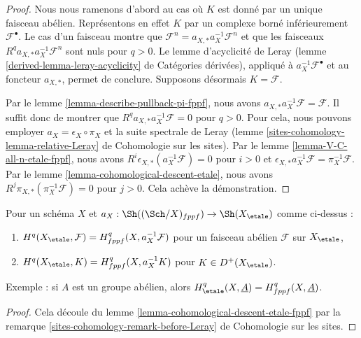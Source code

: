 \begin{proof}
Nous nous ramenons d'abord au cas où
$K$ est donné par un unique faisceau abélien. Représentons en effet $K$
par un complexe borné inférieurement $\mathcal{F}^\bullet$. Le cas d'un
faisceau montre que
$\mathcal{F}^n = a_{X, *} a_X^{-1} \mathcal{F}^n$
et que les faisceaux $R^qa_{X, *}a_X^{-1}\mathcal{F}^n$
sont nuls pour $q > 0$. Le lemme d'acyclicité de Leray
(lemme \ref{derived-lemma-leray-acyclicity} de Catégories dérivées),
appliqué à $a_X^{-1}\mathcal{F}^\bullet$
et au foncteur $a_{X, *}$, permet de conclure. Supposons désormais $K = \mathcal{F}$.

\medskip\noindent
Par le lemme \ref{lemma-describe-pullback-pi-fppf}, nous avons
$a_{X, *}a_X^{-1}\mathcal{F} = \mathcal{F}$. Il suffit donc de montrer que
$R^qa_{X, *}a_X^{-1}\mathcal{F} = 0$ pour $q > 0$.
Pour cela, nous pouvons employer $a_X = \epsilon_X \circ \pi_X$ et
la suite spectrale de Leray
(lemme \ref{sites-cohomology-lemma-relative-Leray} de Cohomologie sur les sites).
Par le lemme \ref{lemma-V-C-all-n-etale-fppf},
nous avons $R^i\epsilon_{X, *}(a_X^{-1}\mathcal{F}) = 0$ pour $i > 0$
et
$\epsilon_{X, *}a_X^{-1}\mathcal{F} = \pi_X^{-1}\mathcal{F}$.
Par le lemme \ref{lemma-cohomological-descent-etale}, nous avons
$R^j\pi_{X, *}(\pi_X^{-1}\mathcal{F}) = 0$ pour $j > 0$.
Cela achève la démonstration.
\end{proof}

\begin{lemma}
\label{lemma-compare-cohomology-etale-fppf}
Pour un schéma $X$ et $a_X : \Sh((\Sch/X)_{fppf}) \to \Sh(X_\etale)$
comme ci-dessus :
\begin{enumerate}
\item $H^q(X_\etale, \mathcal{F}) = H^q_{fppf}(X, a_X^{-1}\mathcal{F})$
pour un faisceau abélien $\mathcal{F}$ sur $X_\etale$,
\item $H^q(X_\etale, K) = H^q_{fppf}(X, a_X^{-1}K)$ pour $K \in D^+(X_\etale)$.
\end{enumerate}
Exemple : si $A$ est un groupe abélien, alors
$H^q_\etale(X, \underline{A}) = H^q_{fppf}(X, \underline{A})$.
\end{lemma}

\begin{proof}
Cela découle du lemme \ref{lemma-cohomological-descent-etale-fppf}
par la remarque \ref{sites-cohomology-remark-before-Leray} de Cohomologie sur les sites.
\end{proof}







